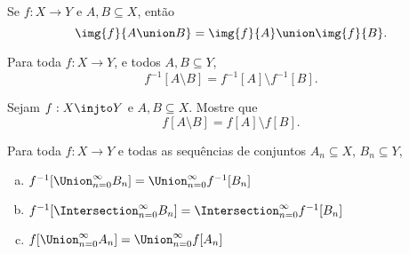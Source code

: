 \begin{exercise}
    Se $f : X \to Y$ e $A, B \subseteq X$, então 
    $$
    \img {f} {A \union B} = \img {f} {A} \union \img {f} {B}.
    $$
\end{exercise}

\begin{exercise}
    Para toda $f : X \to Y$, e todos $A, B \subseteq Y$, 
    $$
    f^{-1}[A \setminus B] = f^{-1} [A] \setminus f^{-1}[B].
    $$
\end{exercise}

\begin{exercise}
    Sejam $f : X \injto Y$ e $A, B \subseteq X$. Mostre que
    $$
    f[A \setminus B] = f[A] \setminus f[B].
    $$
\end{exercise}

\begin{exercise}
    Para toda $f : X \to Y$ e todas as sequências de conjuntos $A_n \subseteq X$, $B_n \subseteq Y$,
    \begin{enumerate}[(a)]
        \item $f^{-1}[\Union^{\infty}_{n=0} B_n] = \Union^{\infty}_{n=0} f^{-1}[B_n]$
        \item $f^{-1}[\Intersection^{\infty}_{n=0} B_n] = \Intersection^{\infty}_{n=0} f^{-1}[B_n]$
        \item $f[\Union^{\infty}_{n=0} A_n] = \Union^{\infty}_{n=0} f[A_n]$
    \end{enumerate}
\end{exercise}
